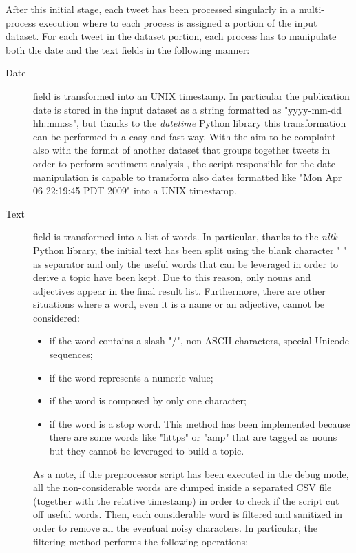 After this initial stage, each tweet has been processed singularly in a multi-process execution where to each process is assigned a portion of the input dataset. For each tweet in the dataset portion, each process has to manipulate both the date and the text fields in the following manner:
\begin{description}
	\item[Date] field is transformed into an UNIX timestamp. In particular the publication date is stored in the input dataset as a string formatted as "yyyy-mm-dd hh:mm:ss", but thanks to the \textit{datetime} Python library this transformation can be performed in a easy and fast way. With the aim to be complaint also with the format of another dataset that groups together tweets in order to perform sentiment analysis \cite{sentiment-analysis-dataset}, the script responsible for the date manipulation is capable to transform also dates formatted like "Mon Apr 06 22:19:45 PDT 2009" into a UNIX timestamp.
	\item[Text] field is transformed into a list of words. In particular, thanks to the \textit{nltk} \cite{python-nltk} Python library, the initial text has been split using the blank character " " as separator and only the useful words that can be leveraged in order to derive a topic have been kept. Due to this reason, only nouns and adjectives appear in the final result list. Furthermore, there are other situations where a word, even it is a name or an adjective, cannot be considered: 
	\begin{itemize}
		\item if the word contains a slash "/", non-ASCII characters, special Unicode sequences;
		\item if the word represents a numeric value;
		\item if the word is composed by only one character;
		\item if the word is a stop word. This method has been implemented because there are some words like "https" or "amp" that are tagged as nouns but they cannot be leveraged to build a topic.
	\end{itemize}
	As a note, if the preprocessor script has been executed in the debug mode, all the non-considerable words are dumped inside a separated CSV file (together with the relative timestamp) in order to check if the script cut off useful words. Then, each considerable word is filtered and sanitized in order to remove all the eventual noisy characters. In particular, the filtering method performs the following operations:

\end{description}
